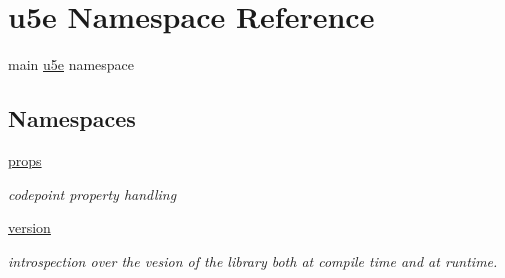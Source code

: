 \hypertarget{namespaceu5e}{}\section{u5e Namespace Reference}
\label{namespaceu5e}


main \hyperlink{namespaceu5e}{u5e} namespace  


\subsection*{Namespaces}
\begin{DoxyCompactItemize}
\item 
 \hyperlink{namespaceu5e_1_1props}{props}
\begin{DoxyCompactList}\small\item\em codepoint property handling \end{DoxyCompactList}\item 
 \hyperlink{namespaceu5e_1_1version}{version}
\begin{DoxyCompactList}\small\item\em introspection over the vesion of the library both at compile time and at runtime. \end{DoxyCompactList}\end{DoxyCompactItemize}
